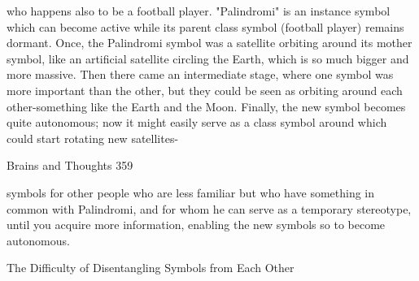 who happens also to be a football player. "Palindromi" is an instance symbol which can
become active while its parent class symbol (football player) remains dormant.
  Once, the Palindromi symbol was a satellite orbiting around its mother symbol, like an
artificial satellite circling the Earth, which is so much bigger and more massive. Then
there came an intermediate stage, where one symbol was more important than the other,
but they could be seen as orbiting around each other-something like the Earth and the
Moon. Finally, the new symbol becomes quite autonomous; now it might easily serve as
a class symbol around which could start rotating new satellites-




Brains and Thoughts                                                                      359

symbols for other people who are less familiar but who have something in common with
Palindromi, and for whom he can serve as a temporary stereotype, until you acquire more
information, enabling the new symbols so to become autonomous.

               The Difficulty of Disentangling Symbols from Each Other

